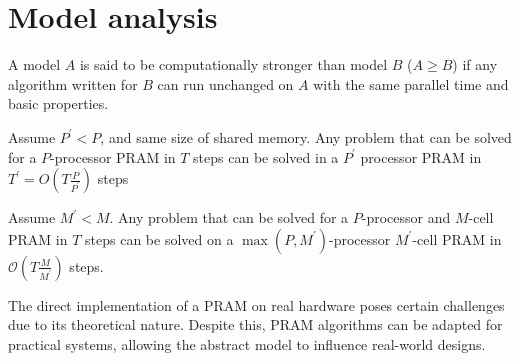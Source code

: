 \section{Model analysis}

\begin{definition}
    A model $A$ is said to be computationally stronger than model $B$ ($A \geq B$) if any algorithm written for $B$ can run unchanged on $A$ with the same parallel time and basic properties.
\end{definition}
\begin{lemma}
    Assume $P^\prime<P$, and same size of shared memory.
    Any problem that can be solved for a $P$-processor PRAM in $T$ steps can be solved in a $P^\prime$ processor PRAM in $T^\prime=O(T\frac{P}{P^\prime})$ steps
\end{lemma}
\begin{lemma}
    Assume $M^\prime < M$. 
    Any problem that can be solved for a $P$-processor and $M$-cell PRAM in $T$ steps can be solved on a $\max(P, M^\prime)$-processor $M^\prime$-cell PRAM in $\mathcal{O}\left(T\frac{M}{M^\prime}\right)$ steps.
\end{lemma}

The direct implementation of a PRAM on real hardware poses certain challenges due to its theoretical nature. 
Despite this, PRAM algorithms can be adapted for practical systems, allowing the abstract model to influence real-world designs.

